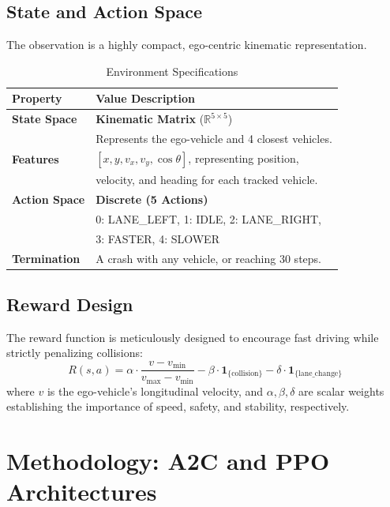 \documentclass[12pt, a4paper]{article}
\begin{document}
\subsection{State and Action Space}
The observation is a highly compact, ego-centric kinematic representation.
\begin{table}[H]
\centering
\large
\caption{Environment Specifications}
\vspace{0.3cm}
\begin{tabular}{@{}ll@{}}
\toprule
\textbf{Property} & \textbf{Value Description} \\ \midrule
\textbf{State Space} & \textbf{Kinematic Matrix} ($\mathbb{R}^{5 \times 5}$) \\
& Represents the ego-vehicle and 4 closest vehicles. \\
\textbf{Features} & $[x, y, v_x, v_y, \cos\theta]$, representing position, \\
& velocity, and heading for each tracked vehicle. \\ \midrule
\textbf{Action Space} & \textbf{Discrete (5 Actions)} \\
& 0: LANE\_LEFT, 1: IDLE, 2: LANE\_RIGHT, \\
& 3: FASTER, 4: SLOWER \\ \midrule
\textbf{Termination} & A crash with any vehicle, or reaching 30 steps. \\
\bottomrule
\end{tabular}
\end{table}

\subsection{Reward Design}
The reward function is meticulously designed to encourage fast driving while strictly penalizing collisions:
\begin{equation}
R(s, a) = \alpha \cdot \frac{v - v_{\min}}{v_{\max} - v_{\min}} - \beta \cdot \mathbf{1}_{\{\text{collision}\}} - \delta \cdot \mathbf{1}_{\{\text{lane\_change}\}}
\end{equation}
where $v$ is the ego-vehicle's longitudinal velocity, and $\alpha, \beta, \delta$ are scalar weights establishing the importance of speed, safety, and stability, respectively.

\section{Methodology: A2C and PPO Architectures}
\end{document}

